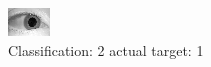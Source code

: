 \begin{figure}[h!]
\begin{center}
\includegraphics[width=0.60\columnwidth]{figures/ID1432_class_2_target_1.png}
\end{center}
\caption{ Classification: 2 actual target: 1}
\label{fig:ID1432_class_2_target_1}
\end{figure}

